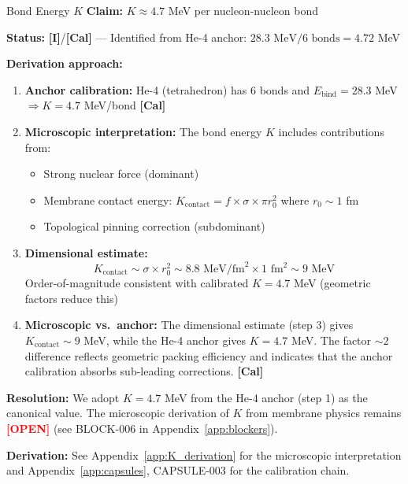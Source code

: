 \documentclass[11pt,a4paper]{article}
\newcommand{\tagI}{\textcolor{orange!80!black}{\textbf{[I]}}}
\newcommand{\tagCal}{\textcolor{purple!70!black}{\textbf{[Cal]}}}
\newcommand{\tagOPEN}{\textcolor{red}{\textbf{[OPEN]}}}
\begin{document}
\begin{capsulebox}{Bond Energy $K$}
\textbf{Claim:} $K \approx 4.7$ MeV per nucleon-nucleon bond

\textbf{Status:} \tagI{}/\tagCal{} --- Identified from He-4 anchor: $28.3 \text{ MeV} / 6 \text{ bonds} = 4.72$ MeV

\textbf{Derivation approach:}
\begin{enumerate}
    \item \textbf{Anchor calibration:} He-4 (tetrahedron) has 6 bonds and $E_{\text{bind}} = 28.3$ MeV $\Rightarrow K = 4.7$ MeV/bond \tagCal{}

    \item \textbf{Microscopic interpretation:} The bond energy $K$ includes contributions from:
    \begin{itemize}[nosep]
        \item Strong nuclear force (dominant)
        \item Membrane contact energy: $K_{\text{contact}} = f \times \sigma \times \pi r_0^2$ where $r_0 \sim 1$ fm
        \item Topological pinning correction (subdominant)
    \end{itemize}

    \item \textbf{Dimensional estimate:}
    \begin{equation}
        K_{\text{contact}} \sim \sigma \times r_0^2 \sim 8.8 \text{ MeV/fm}^2 \times 1 \text{ fm}^2 \sim 9 \text{ MeV}
    \end{equation}
    Order-of-magnitude consistent with calibrated $K = 4.7$ MeV (geometric factors reduce this)

    \item \textbf{Microscopic vs.\ anchor:} The dimensional estimate (step 3) gives $K_{\text{contact}} \sim 9$ MeV, while the He-4 anchor gives $K = 4.7$ MeV. The factor $\sim 2$ difference reflects geometric packing efficiency and indicates that the anchor calibration absorbs sub-leading corrections. \tagCal{}
\end{enumerate}

\textbf{Resolution:} We adopt $K = 4.7$ MeV from the He-4 anchor (step 1) as the canonical value. The microscopic derivation of $K$ from membrane physics remains \tagOPEN{} (see BLOCK-006 in Appendix~\ref{app:blockers}).

\textbf{Derivation:} See Appendix~\ref{app:K_derivation} for the microscopic interpretation and Appendix~\ref{app:capsules}, CAPSULE-003 for the calibration chain.
\end{capsulebox}
\end{document}

